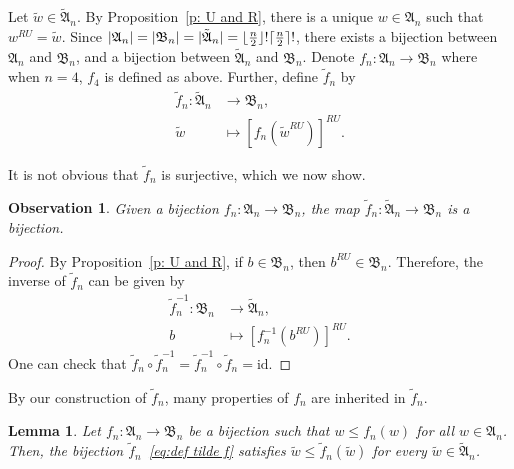 \documentclass[12pt]{amsart}
\DeclarePairedDelimiter\ceil{\lceil}{\rceil}
\DeclarePairedDelimiter\floor{\lfloor}{\rfloor}
\newtheorem{lem}[thm]{Lemma}
\newtheorem{obs}[thm]{Observation}
\theoremstyle{definition}
\numberwithin{equation}{section}
\begin{document}
Let $\tilde{w} \in \tilde{\mathfrak A}_n$. By Proposition~\ref{p: U and R}, there is a unique $w\in \mathfrak A_n$ such that $w^{RU} = \tilde{w}$. Since $|\mathfrak A_n|=|\mathfrak B_n| = |\tilde{\mathfrak A}_n|=\floor{\tfrac{n}{2}}!\ceil{\tfrac{n}{2}}!$, there exists a bijection between $\mathfrak A_n$ and $\mathfrak B_n$, and a bijection between $\tilde{\mathfrak A}_n$ and $\mathfrak B_n$. Denote $f_n: \mathfrak A_n\rightarrow \mathfrak B_n$ where when $n=4$, $f_4$ is defined as above. Further, define $\tilde{f}_n$ by \begin{equation}\label{eq:def tilde f}
\begin{aligned}
    \tilde{f}_n : \tilde{\mathfrak A}_n &\rightarrow \mathfrak B_n, \\
    \tilde{w} &\mapsto [f_n(\tilde{w}^{RU})]^{RU}.
    \end{aligned}
\end{equation}

It is not obvious that $\tilde{f}_n$ is surjective, which we now show.

\begin{obs}\label{o:well-define tilde f}
    Given a bijection $f_n:\mathfrak  A_n \rightarrow \mathfrak  B_n$, the map $\tilde{f}_n: \tilde{\mathfrak A}_n \rightarrow \mathfrak B_n$ is a bijection.
\end{obs}

\begin{proof}
    By Proposition~\ref{p: U and R}, if $b\in \mathfrak  B_n$, then $b^{RU} \in \mathfrak B_n$. Therefore, the inverse of $\tilde{f}_n$ can be given by \begin{equation*}
    \begin{aligned}
        \tilde{f}_n^{-1}:\mathfrak  B_n &\rightarrow \tilde{\mathfrak A}_n, \\
        b &\mapsto [f_n^{-1}(b^{RU})]^{RU}.
        \end{aligned}
    \end{equation*}
    One can check that $\tilde{f}_n\circ\tilde{f}_n^{-1}=\tilde{f}_n^{-1}\circ\tilde{f}_n=\text{id}$.
\end{proof}

By our construction of $\tilde{f}_n$, many properties of $f_n$ are inherited in $\tilde{f}_n$.

\begin{lem}\label{lem:induced bijection}
    Let $f_n: \mathfrak A_n \rightarrow \mathfrak B_n$ be a bijection such that $w \leq f_n(w)$ for all $w\in \mathfrak A_n$. Then, the bijection $\tilde{f}_n$~\eqref{eq:def tilde f} satisfies $\tilde{w} \leq \tilde{f}_n(\tilde{w})$ for every $\tilde{w} \in \tilde{\mathfrak A}_n$.
\end{lem}
\end{document}
